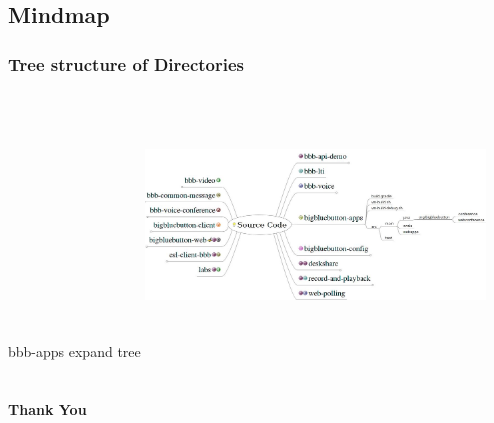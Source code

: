 \documentclass{beamer}
\begin{document}
\subsection*{Mindmap}
\begin{frame}
\frametitle{Tree structure of Directories}
{bbb-apps expand tree}
\includegraphics[height=70mm,width=90mm]{./images/SourceCode7.jpeg}
\end{frame}





%
%
%
%
%
%
%
%
%
%
%
\addtocounter{framenumber}{-1}
\section*{}
\subsection*{}
\begin{frame}
	\begin{block}{\Large \bf {Thank You}}
	\end{block}
\end{frame}
\end{document}

